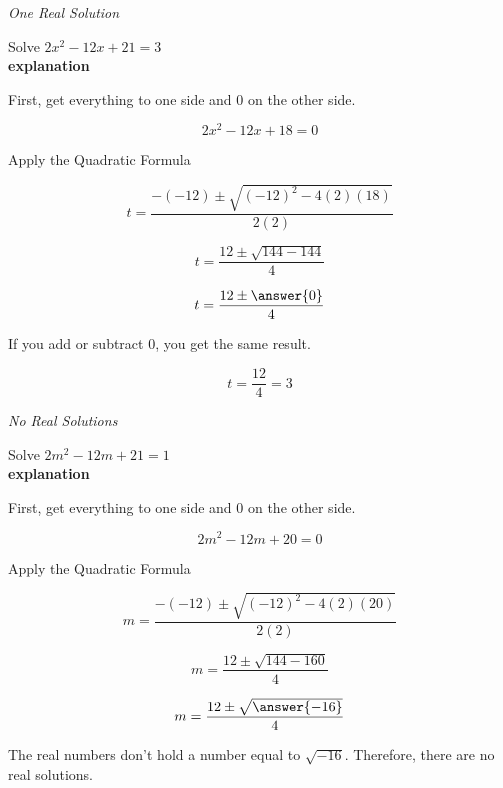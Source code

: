\documentclass{ximera}
\begin{document}
\begin{example} \textit{One Real Solution}

Solve $2 x^2 - 12x + 21 = 3$ \\


\textbf{\textcolor{red!75!green}{explanation}} 


First, get everything to one side and $0$ on the other side.



\[  2 x^2 - 12x + 18 = 0  \]

Apply the Quadratic Formula


\[   t = \frac{-(-12) \pm \sqrt{(-12)^2 - 4 (2) (18)}}{2 (2)}            \]



\[   t = \frac{12 \pm \sqrt{144 - 144}}{4}            \]

\[   t = \frac{12 \pm \answer{0}}{4}            \]

If you add or subtract $0$, you get the same result.

\[   t = \frac{12}{4}   = 3         \]






\end{example}








\begin{example} \textit{No Real Solutions}

Solve $2 m^2 - 12m + 21 = 1$ \\


\textbf{\textcolor{red!75!green}{explanation}} 


First, get everything to one side and $0$ on the other side.



\[  2 m^2 - 12m + 20 = 0  \]

Apply the Quadratic Formula


\[   m = \frac{-(-12) \pm \sqrt{(-12)^2 - 4 (2) (20)}}{2 (2)}            \]

\[   m = \frac{12 \pm \sqrt{144 - 160}}{4}            \]

\[   m = \frac{12 \pm \sqrt{\answer{-16}}}{4}            \]



The real numbers don't hold a number equal to $\sqrt{-16}$.  Therefore, there are no real solutions.





\end{example}
\end{document}
